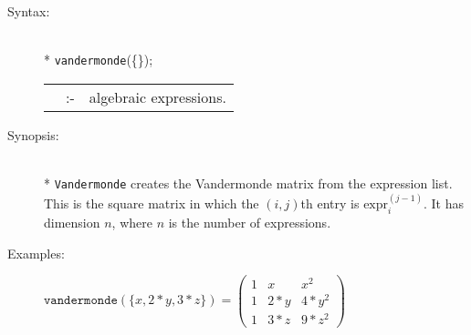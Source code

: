 \begin{description}
\item[Syntax:]\mbox{}\\*
\texttt{vandermonde}(\{\exprlist{}\});
\lazyfootnote{}\\[2mm]
\begin{tabular}{l l l}
\exprlist{} &:-& algebraic expressions.
\end{tabular}

\item[Synopsis:]\mbox{}\\*
  \texttt{Vandermonde} creates the Vandermonde matrix from the expression list.
  This is the square matrix in which the $(i,j)$th entry is $\text{expr}_i^{(j-1)}$.
  It has dimension $n$, where $n$ is the number of expressions.

\item[Examples:]
\begin{flushleft}
\(
  \texttt{vandermonde}(\{x,2*y,3*z\}) =
  \begin{pmatrix} 1 & x & x^2 \\ 1 & 2*y & 4*y^2 \\ 1 & 3*z & 9*z^2 \end{pmatrix}
\)
\end{flushleft}
\end{description}

